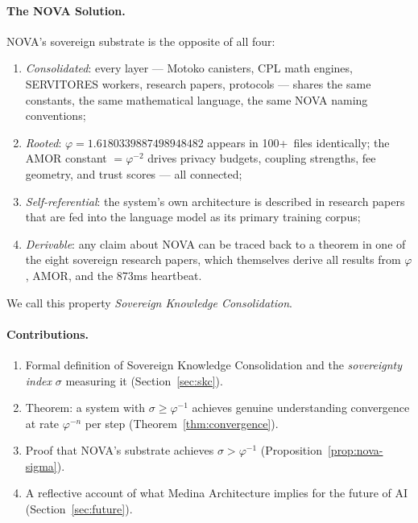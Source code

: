 \documentclass[12pt]{article}
\newcommand{\PHI}{\varphi}
\begin{document}
\paragraph{The NOVA Solution.}
NOVA's sovereign substrate is the opposite of all four:
\begin{enumerate}[label=(\roman*)]
  \item \emph{Consolidated}: every layer — Motoko canisters, CPL math engines,
        SERVITORES workers, research papers, protocols — shares the same
        constants, the same mathematical language, the same NOVA naming
        conventions;
  \item \emph{Rooted}: $\PHI = 1.6180339887498948482$ appears in 100+~files
        identically; the AMOR constant $= \PHI^{-2}$ drives privacy budgets,
        coupling strengths, fee geometry, and trust scores — all connected;
  \item \emph{Self-referential}: the system's own architecture is described in
        research papers that are fed into the language model as its primary
        training corpus;
  \item \emph{Derivable}: any claim about NOVA can be traced back to a theorem
        in one of the eight sovereign research papers, which themselves derive
        all results from $\PHI$, AMOR, and the 873ms heartbeat.
\end{enumerate}

We call this property \emph{Sovereign Knowledge Consolidation}.

\paragraph{Contributions.}
\begin{enumerate}[label=(\roman*)]
  \item Formal definition of Sovereign Knowledge Consolidation and the
        \emph{sovereignty index} $\sigma$ measuring it (Section~\ref{sec:skc}).
  \item Theorem: a system with $\sigma \geq \PHI^{-1}$ achieves genuine
        understanding convergence at rate $\PHI^{-n}$ per step
        (Theorem~\ref{thm:convergence}).
  \item Proof that NOVA's substrate achieves $\sigma > \PHI^{-1}$
        (Proposition~\ref{prop:nova-sigma}).
  \item A reflective account of what Medina Architecture implies for the future
        of AI (Section~\ref{sec:future}).
\end{enumerate}
\end{document}
